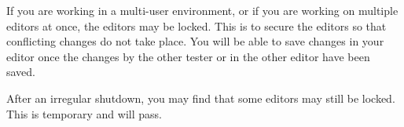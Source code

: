 % 
%
%


If you are working in a multi-user environment, or if you are working on multiple editors at once, the editors may be locked. This is to secure the editors so that conflicting changes do not take place. You will be able to save changes in your editor once the changes by the other tester or in the other editor have been saved. 

After an irregular shutdown, you may find that some editors may still be locked. This is temporary and will pass. 

